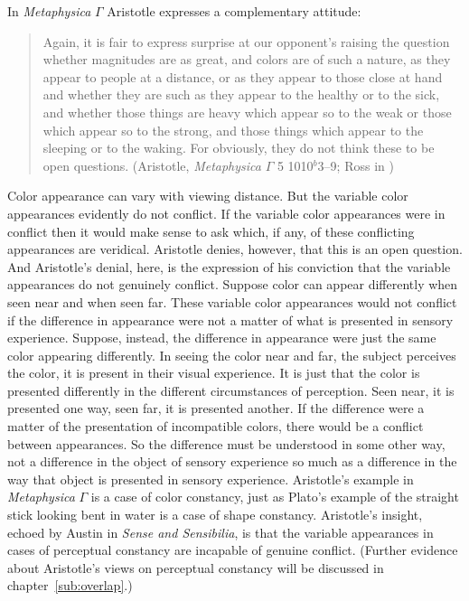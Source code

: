 In \emph{Metaphysica} \( \Gamma \) Aristotle expresses a complementary attitude:
\begin{quote}
	Again, it is fair to express surprise at our opponent's raising the question whether magnitudes are as great, and colors are of such a nature, as they appear to people at a distance, or as they appear to those close at hand and whether they are such as they appear to the healthy or to the sick, and whether those things are heavy which appear so to the weak or those which appear so to the strong, and those things which appear to the sleeping or to the waking. For obviously, they do not think these to be open questions. (Aristotle, \emph{Metaphysica} \( \Gamma \) 5 1010\( ^{b} \)3--9; Ross in \citealt[55]{Barnes:1984kx})
\end{quote}
Color appearance can vary with viewing distance. But the variable color appearances evidently do not conflict. If the variable color appearances were in conflict then it would make sense to ask which, if any, of these conflicting appearances are veridical. Aristotle denies, however, that this is an open question. And Aristotle's denial, here, is the expression of his conviction that the variable appearances do not genuinely conflict. Suppose color can appear differently when seen near and when seen far. These variable color appearances would not conflict if the difference in appearance were not a matter of what is presented in sensory experience. Suppose, instead, the difference in appearance were just the same color appearing differently. In seeing the color near and far, the subject perceives the color, it is present in their visual experience. It is just that the color is presented differently in the different circumstances of perception. Seen near, it is presented one way, seen far, it is presented another. If the difference were a matter of the presentation of incompatible colors, there would be a conflict between appearances. So the difference must be understood in some other way, not a difference in the object of sensory experience so much as a difference in the way that object is presented in sensory experience. Aristotle's example in \emph{Metaphysica} \( \Gamma \) is a case of color constancy, just as Plato's example of the straight stick looking bent in water is a case of shape constancy. Aristotle's insight, echoed by Austin in \emph{Sense and Sensibilia}, is that the variable appearances in cases of perceptual constancy are incapable of genuine conflict. (Further evidence about Aristotle's views on perceptual constancy will be discussed in chapter~\ref{sub:overlap}.)

